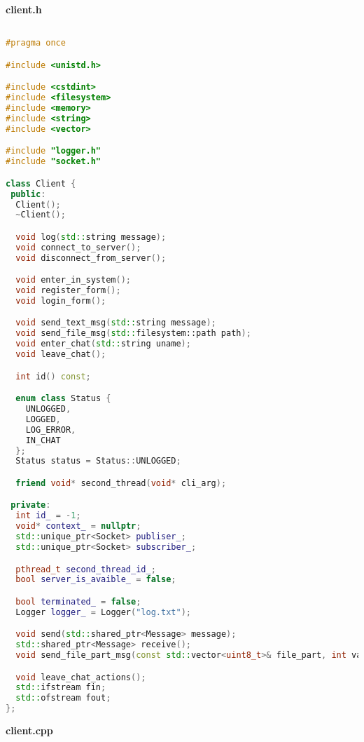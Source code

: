 \textbf{client.h}

\begin{lstlisting}[language=C++]

#pragma once

#include <unistd.h>

#include <cstdint>
#include <filesystem>
#include <memory>
#include <string>
#include <vector>

#include "logger.h"
#include "socket.h"

class Client {
 public:
  Client();
  ~Client();

  void log(std::string message);
  void connect_to_server();
  void disconnect_from_server();

  void enter_in_system();
  void register_form();
  void login_form();

  void send_text_msg(std::string message);
  void send_file_msg(std::filesystem::path path);
  void enter_chat(std::string uname);
  void leave_chat();

  int id() const;

  enum class Status {
    UNLOGGED,
    LOGGED,
    LOG_ERROR,
    IN_CHAT
  };
  Status status = Status::UNLOGGED;

  friend void* second_thread(void* cli_arg);

 private:
  int id_ = -1;
  void* context_ = nullptr;
  std::unique_ptr<Socket> publiser_;
  std::unique_ptr<Socket> subscriber_;

  pthread_t second_thread_id_;
  bool server_is_avaible_ = false;

  bool terminated_ = false;
  Logger logger_ = Logger("log.txt");

  void send(std::shared_ptr<Message> message);
  std::shared_ptr<Message> receive();
  void send_file_part_msg(const std::vector<uint8_t>& file_part, int value);

  void leave_chat_actions();
  std::ifstream fin;
  std::ofstream fout;
};

\end{lstlisting}

\textbf{client.cpp}

